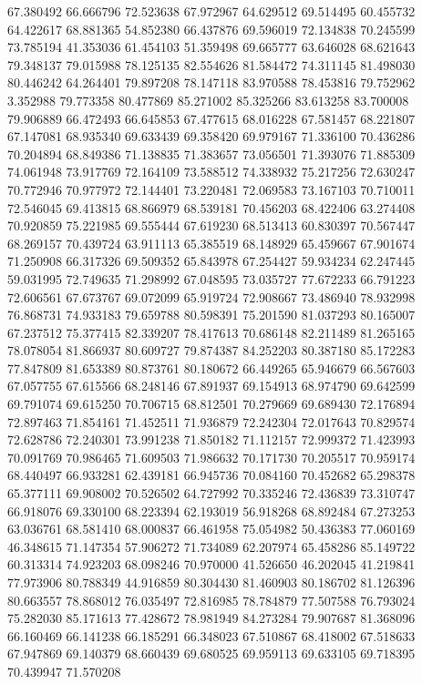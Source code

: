 67.380492
66.666796
72.523638
67.972967
64.629512
69.514495
60.455732
64.422617
68.881365
54.852380
66.437876
69.596019
72.134838
70.245599
73.785194
41.353036
61.454103
51.359498
69.665777
63.646028
68.621643
79.348137
79.015988
78.125135
82.554626
81.584472
74.311145
81.498030
80.446242
64.264401
79.897208
78.147118
83.970588
78.453816
79.752962
3.352988
79.773358
80.477869
85.271002
85.325266
83.613258
83.700008
79.906889
66.472493
66.645853
67.477615
68.016228
67.581457
68.221807
67.147081
68.935340
69.633439
69.358420
69.979167
71.336100
70.436286
70.204894
68.849386
71.138835
71.383657
73.056501
71.393076
71.885309
74.061948
73.917769
72.164109
73.588512
74.338932
75.217256
72.630247
70.772946
70.977972
72.144401
73.220481
72.069583
73.167103
70.710011
72.546045
69.413815
68.866979
68.539181
70.456203
68.422406
63.274408
70.920859
75.221985
69.555444
67.619230
68.513413
60.830397
70.567447
68.269157
70.439724
63.911113
65.385519
68.148929
65.459667
67.901674
71.250908
66.317326
69.509352
65.843978
67.254427
59.934234
62.247445
59.031995
72.749635
71.298992
67.048595
73.035727
77.672233
66.791223
72.606561
67.673767
69.072099
65.919724
72.908667
73.486940
78.932998
76.868731
74.933183
79.659788
80.598391
75.201590
81.037293
80.165007
67.237512
75.377415
82.339207
78.417613
70.686148
82.211489
81.265165
78.078054
81.866937
80.609727
79.874387
84.252203
80.387180
85.172283
77.847809
81.653389
80.873761
80.180672
66.449265
65.946679
66.567603
67.057755
67.615566
68.248146
67.891937
69.154913
68.974790
69.642599
69.791074
69.615250
70.706715
68.812501
70.279669
69.689430
72.176894
72.897463
71.854161
71.452511
71.936879
72.242304
72.017643
70.829574
72.628786
72.240301
73.991238
71.850182
71.112157
72.999372
71.423993
70.091769
70.986465
71.609503
71.986632
70.171730
70.205517
70.959174
68.440497
66.933281
62.439181
66.945736
70.084160
70.452682
65.298378
65.377111
69.908002
70.526502
64.727992
70.335246
72.436839
73.310747
66.918076
69.330100
68.223394
62.193019
56.918268
68.892484
67.273253
63.036761
68.581410
68.000837
66.461958
75.054982
50.436383
77.060169
46.348615
71.147354
57.906272
71.734089
62.207974
65.458286
85.149722
60.313314
74.923203
68.098246
70.970000
41.526650
46.202045
41.219841
77.973906
80.788349
44.916859
80.304430
81.460903
80.186702
81.126396
80.663557
78.868012
76.035497
72.816985
78.784879
77.507588
76.793024
75.282030
85.171613
77.428672
78.981949
84.273284
79.907687
81.368096
66.160469
66.141238
66.185291
66.348023
67.510867
68.418002
67.518633
67.947869
69.140379
68.660439
69.680525
69.959113
69.633105
69.718395
70.439947
71.570208
